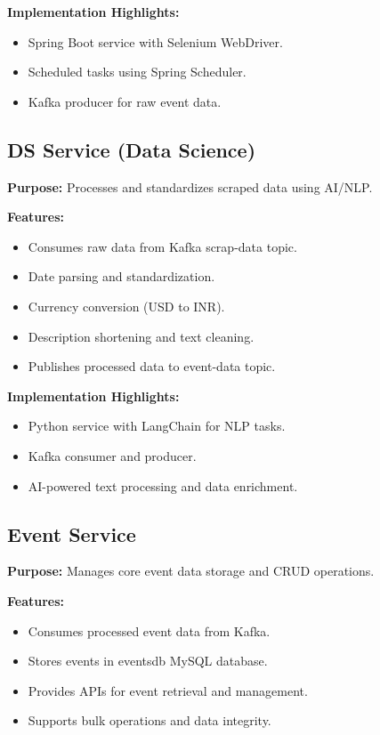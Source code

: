 \documentclass[12pt,a4paper]{report}
\begin{document}
\textbf{Implementation Highlights:}
\begin{itemize}
    \item Spring Boot service with Selenium WebDriver.
    \item Scheduled tasks using Spring Scheduler.
    \item Kafka producer for raw event data.
\end{itemize}

\subsection{DS Service (Data Science)}

\textbf{Purpose:} Processes and standardizes scraped data using AI/NLP.

\textbf{Features:}
\begin{itemize}
    \item Consumes raw data from Kafka scrap-data topic.
    \item Date parsing and standardization.
    \item Currency conversion (USD to INR).
    \item Description shortening and text cleaning.
    \item Publishes processed data to event-data topic.
\end{itemize}

\textbf{Implementation Highlights:}
\begin{itemize}
    \item Python service with LangChain for NLP tasks.
    \item Kafka consumer and producer.
    \item AI-powered text processing and data enrichment.
\end{itemize}

\subsection{Event Service}

\textbf{Purpose:} Manages core event data storage and CRUD operations.

\textbf{Features:}
\begin{itemize}
    \item Consumes processed event data from Kafka.
    \item Stores events in eventsdb MySQL database.
    \item Provides APIs for event retrieval and management.
    \item Supports bulk operations and data integrity.
\end{itemize}
\end{document}
